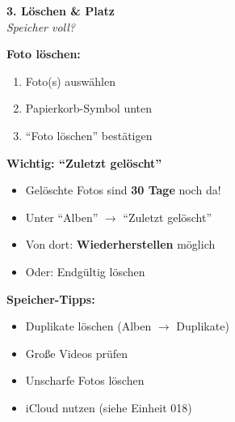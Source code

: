 \documentclass[a4paper,landscape,8pt]{extarticle}
\begin{document}
\hfill%
\begin{minipage}[t]{0.32\linewidth}
\begin{center}
\colorbox{trashred!10}{%
\begin{minipage}{0.95\linewidth}
\vspace{2mm}
\begin{center}
{\Large\bfseries\textcolor{trashred}{3. Löschen \& Platz}}\\[1pt]
{\footnotesize\itshape Speicher voll?}
\end{center}
\vspace{2mm}
\end{minipage}%
}
\end{center}

\vspace{1mm}

\textbf{Foto löschen:}
\begin{enumerate}
\item Foto(s) auswählen
\item Papierkorb-Symbol unten
\item ``Foto löschen'' bestätigen
\end{enumerate}

\textbf{Wichtig: ``Zuletzt gelöscht''}
\begin{itemize}
\item Gelöschte Fotos sind \textbf{30 Tage} noch da!
\item Unter ``Alben'' $\rightarrow$ ``Zuletzt gelöscht''
\item Von dort: \textbf{Wiederherstellen} möglich
\item Oder: Endgültig löschen
\end{itemize}

\vspace{2mm}

\vspace{2mm}

\textbf{Speicher-Tipps:}
\begin{itemize}
\item Duplikate löschen (Alben $\rightarrow$ Duplikate)
\item Große Videos prüfen
\item Unscharfe Fotos löschen
\item iCloud nutzen (siehe Einheit 018)
\end{itemize}

\end{minipage}
\end{document}
